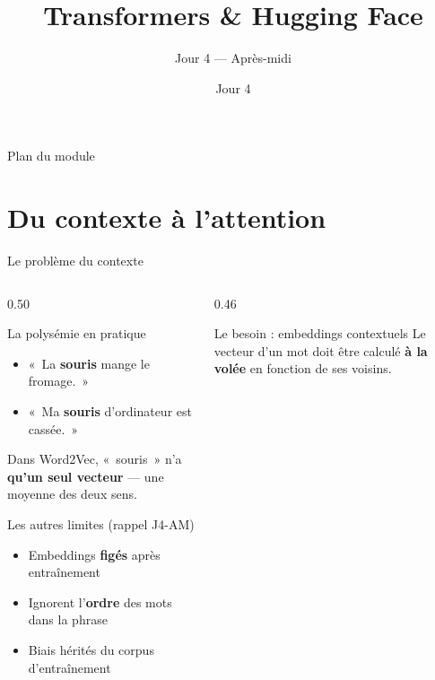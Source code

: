 \documentclass[aspectratio=169, 10pt]{beamer}
\title[Transformers]{Transformers \& Hugging Face}
\subtitle{Jour 4 --- Après-midi}
\date{Jour 4}
\begin{document}

\begin{frame}
  \titlepage
\end{frame}

\begin{frame}{Plan du module}
  \tableofcontents
\end{frame}

\section{Du contexte à l'attention}

\begin{frame}{Le problème du contexte}
  \begin{columns}[T]
    \begin{column}{0.50\textwidth}
      \begin{alertblock}{La polysémie en pratique}
        \begin{itemize}
          \item «~La \textbf{souris} mange le fromage.~»
          \item «~Ma \textbf{souris} d'ordinateur est cassée.~»
        \end{itemize}
        \vspace{4pt}
        Dans Word2Vec, «~souris~» n'a \textbf{qu'un seul vecteur}
        --- une moyenne des deux sens.
      \end{alertblock}
      \smallskip
      \begin{block}{Les autres limites (rappel J4-AM)}
        \begin{itemize}
          \item Embeddings \textbf{figés} après entraînement
          \item Ignorent l'\textbf{ordre} des mots dans la phrase
          \item Biais hérités du corpus d'entraînement
        \end{itemize}
      \end{block}
    \end{column}
    \begin{column}{0.46\textwidth}
      \begin{exampleblock}{Le besoin : embeddings contextuels}
        Le vecteur d'un mot doit être calculé
        \textbf{à la volée} en fonction de ses voisins.

\end{exampleblock}
\end{column}
\end{columns}
\end{frame}
\end{document}
